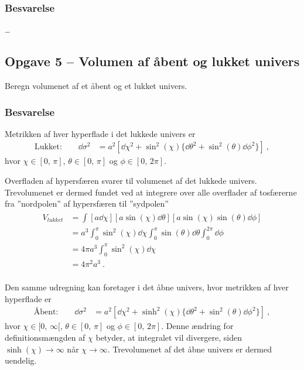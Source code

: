 \documentclass[../main.tex]{subfiles}
\begin{document}

\subsubsection*{Besvarelse}

\ldots




\subsection{Opgave 5 -- Volumen af åbent og lukket univers}
\setcounter{subsection}{5}
\setcounter{equation}{0}

Beregn volumenet af et åbent og et lukket univers.


\subsubsection*{Besvarelse}

Metrikken af hver hyperflade i det lukkede univers er
\begin{align}
    \text{Lukket:} \qquad
    \dd \sigma^2 &= a^2 \left[ \dd\chi^2 + \sin^2(\chi) \{ \dd \theta^2 + \sin^2(\theta) \dd \phi^2 \} \right] \: ,
\end{align}
hvor $\chi \in [0,\, \pi]$, $\theta \in [0,\, \pi]$ og $\phi \in [0,\, 2\pi]$.

Overfladen af hypersfæren svarer til volumenet af det lukkede univers. Trevolumenet er dermed fundet ved at integrere over alle overflader af tosfærerne fra ''nordpolen'' af hypersfæren til ''sydpolen''
\begin{align}
\begin{split}
    V_{lukket} &= \int [a \dd \chi] [a \sin(\chi) \dd \theta] [a \sin(\chi) \sin(\theta) \dd \phi] \\
        &= a^3 \int_0^\pi \sin^2(\chi) \dd \chi \int_0^\pi \sin(\theta) \dd\theta \int_0^{2\pi} \dd\phi \\
        &= 4 \pi a^3 \int_0^\pi \sin^2(\chi) \dd \chi \\
        &= 4 \pi^2 a^3 \: .
\end{split}
\end{align}
\\

Den samme udregning kan foretager i det åbne univers, hvor metrikken af hver hyperflade er
\begin{align}
    \text{Åbent:} \qquad
    \dd \sigma^2 &= a^2 \left[ \dd\chi^2 + \sinh^2(\chi) \{ \dd \theta^2 + \sin^2(\theta) \dd \phi^2 \} \right] \: ,
\end{align}
hvor $\chi \in [0,\, \infty[$, $\theta \in [0,\, \pi]$ og $\phi \in [0,\, 2\pi]$. Denne ændring for definitionsmængden af $\chi$ betyder, at integralet vil divergere, siden $\sinh(\chi) \rightarrow \infty$ når $\chi \rightarrow \infty$. Trevolumenet af det åbne univers er dermed uendelig.



\end{document}
